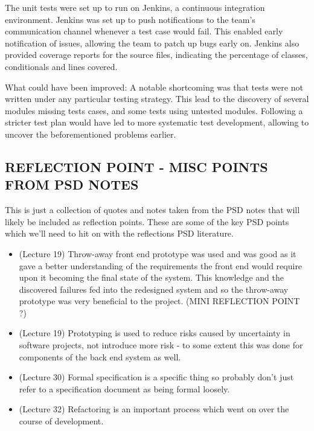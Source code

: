 \documentclass{l3proj}
\begin{document}
The unit tests were set up to run on Jenkins, a continuous integration environment.
Jenkins was set up to push notifications to the team's communication channel whenever a test case would fail. This enabled early notification of issues, allowing the team to patch up bugs early on.
Jenkins also provided coverage reports for the source files, indicating the percentage of classes, conditionals and lines covered.

What could have been improved:
A notable shortcoming was that tests were not written under any particular testing strategy. This lead to the discovery of several modules missing tests cases, and some tests using untested modules. Following a stricter test plan would have led to more systematic test development, allowing to uncover the beforementioned problems earlier.


\subsection{REFLECTION POINT - MISC POINTS FROM PSD NOTES}
\label{sec:miscpsd}

This is just a collection of quotes and notes taken from the PSD notes that will likely be included as reflection points. These are some of the key PSD points which we'll need to hit on with the reflections PSD literature.
\begin{itemize}
\item (Lecture 19) Throw-away front end prototype was used and was good as it gave a better understanding of the requirements the front end would require upon it becoming the final state of the system. This knowledge and the discovered failures fed into the redesigned system and so the throw-away prototype was very beneficial to the project. (MINI REFLECTION POINT ?)
\item (Lecture 19) Prototyping is used to reduce risks caused by uncertainty in software projects, not introduce more risk - to some extent this was done for components of the back end system as well.
\item (Lecture 30) Formal specification is a specific thing so probably don't just refer to a specification document as being formal loosely.
\item (Lecture 32) Refactoring is an important process which went on over the course of development.
\end{itemize}
\end{document}
